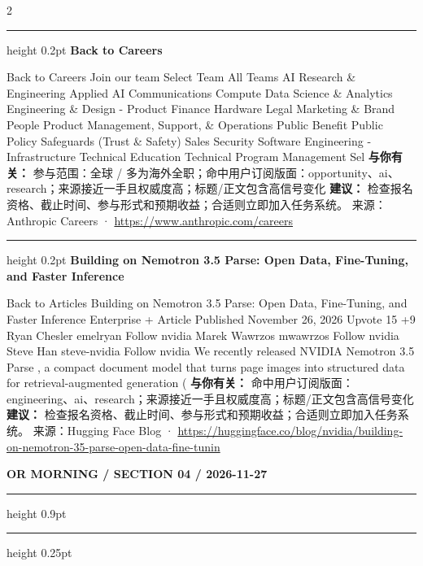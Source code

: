 \documentclass[10.5pt]{ctexart}
\begin{document}
\begin{multicols}{2}
\vspace{2mm}
\hrule height 0.2pt
\vspace{2mm}
{\large\bfseries Back to Careers}\par
Back to Careers Join our team Select Team All Teams AI Research \& Engineering Applied AI Communications Compute Data Science \& Analytics Engineering \& Design - Product Finance Hardware Legal Marketing \& Brand People Product Management, Support, \& Operations Public Benefit Public Policy Safeguards (Trust \& Safety) Sales Security Software Engineering - Infrastructure Technical Education Technical Program Management Sel
\textbf{与你有关：} 参与范围：全球 / 多为海外全职；命中用户订阅版面：opportunity、ai、research；来源接近一手且权威度高；标题/正文包含高信号变化
\textbf{建议：} 检查报名资格、截止时间、参与形式和预期收益；合适则立即加入任务系统。
{\footnotesize\color{ormuted} 来源：Anthropic Careers · \url{https://www.anthropic.com/careers}}
\vspace{2mm}
\hrule height 0.2pt
\vspace{2mm}
{\large\bfseries Building on Nemotron 3.5 Parse: Open Data, Fine-Tuning, and Faster Inference}\par
Back to Articles Building on Nemotron 3.5 Parse: Open Data, Fine-Tuning, and Faster Inference Enterprise + Article Published November 26, 2026 Upvote 15 +9 Ryan Chesler emelryan Follow nvidia Marek Wawrzos mwawrzos Follow nvidia Steve Han steve-nvidia Follow nvidia We recently released NVIDIA Nemotron 3.5 Parse , a compact document model that turns page images into structured data for retrieval-augmented generation (
\textbf{与你有关：} 命中用户订阅版面：engineering、ai、research；来源接近一手且权威度高；标题/正文包含高信号变化
\textbf{建议：} 检查报名资格、截止时间、参与形式和预期收益；合适则立即加入任务系统。
{\footnotesize\color{ormuted} 来源：Hugging Face Blog · \url{https://huggingface.co/blog/nvidia/building-on-nemotron-35-parse-open-data-fine-tunin}}
\end{multicols}
\newpage
{\small\bfseries OR MORNING / SECTION 04 / 2026-11-27}
\vspace{2mm}
\hrule height 0.9pt
\vspace{1.5mm}
\hrule height 0.25pt
\vspace{4mm}
\end{document}
